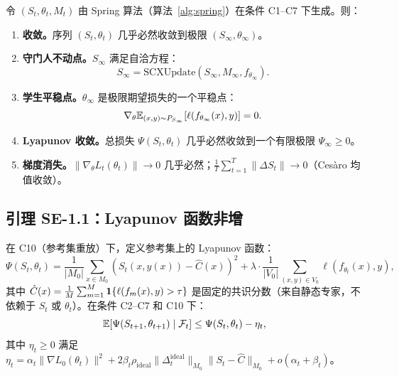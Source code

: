 \begin{theorem}\label{thm:spring1}
令 $(S_t, \theta_t, M_t)$ 由 Spring 算法（算法~\ref{alg:spring}）在条件 C1--C7 下生成。则：
\begin{enumerate}[label=(\alph*), nosep]
    \item \textbf{收敛。}序列 $(S_t, \theta_t)$ 几乎必然收敛到极限 $(S_\infty, \theta_\infty)$。
    \item \textbf{守门人不动点。}$S_\infty$ 满足自洽方程：
    \begin{equation}
        S_\infty = \text{SCXUpdate}(S_\infty, M_\infty, f_{\theta_\infty}).
    \end{equation}
    \item \textbf{学生平稳点。}$\theta_\infty$ 是极限期望损失的一个平稳点：
    \begin{equation}
        \nabla_\theta \mathbb{E}_{(x,y) \sim P_{S_\infty}}[\ell(f_{\theta_\infty}(x), y)] = 0.
    \end{equation}
    \item \textbf{Lyapunov 收敛。}总损失 $\Psi(S_t, \theta_t)$ 几乎必然收敛到一个有限极限 $\Psi_\infty \geq 0$。
    \item \textbf{梯度消失。}$\|\nabla_\theta L_t(\theta_t)\| \to 0$ 几乎必然；$\frac{1}{T}\sum_{t=1}^{T}\|\Delta S_t\| \to 0$（Ces\`{a}ro 均值收敛）。
\end{enumerate}
\end{theorem}

\subsection{引理 SE-1.1：Lyapunov 函数非增}

\begin{lemma}[Lyapunov 函数]\label{lem:lyapunov-se1}
在 C10（参考集重放）下，定义参考集上的 Lyapunov 函数：
\begin{equation}\label{eq:lyapunov-def}
    \Psi(S_t, \theta_t) = \frac{1}{|M_0|} \sum_{x \in M_0} (S_t(x, y(x)) - \hat{C}(x))^2 + \lambda \cdot \frac{1}{|V_0|} \sum_{(x,y) \in V_0} \ell(f_{\theta_t}(x), y),
\end{equation}
其中 $\hat{C}(x) = \frac{1}{M}\sum_{m=1}^M \mathbf{1}\{\ell(f_m(x), y) > \tau\}$ 是固定的共识分数（来自静态专家，不依赖于 $S_t$ 或 $\theta_t$）。在条件 C2--C7 和 C10 下：
\begin{equation}\label{eq:descent-se1}
    \mathbb{E}[\Psi(S_{t+1}, \theta_{t+1}) \mid \mathcal{F}_t] \leq \Psi(S_t, \theta_t) - \eta_t,
\end{equation}
其中 $\eta_t \geq 0$ 满足 $\eta_t = \alpha_t \|\nabla L_0(\theta_t)\|^2 + 2\beta_t \rho_{\text{ideal}} \|\Delta_t^{\text{ideal}}\|_{M_0} \|S_t - \hat{C}\|_{M_0} + o(\alpha_t + \beta_t)$。
\end{lemma}

